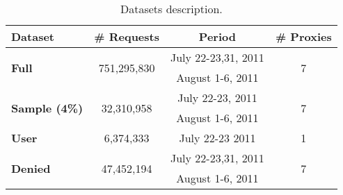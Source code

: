 \documentclass{sig-alternate-2013}
\begin{document}
\begin{table}[t]
\centering
\small
\begin{tabular}{|l|c|c|c|}
	\hline
	 {\bf Dataset} & {\bf \# Requests} & {\bf Period}  & {\bf \# Proxies} \\ 
	\hline 	
	\multirow{2}{*}{\bf Full} & \multirow{2}{*}{751,295,830} &  July 22-23,31, 2011 & \multirow{2}{*}{7} \\
	& & August 1-6, 2011 &  \\ 
\hline
	\multirow{2}{*}{\bf Sample (4\%)} & \multirow{2}{*}{32,310,958} &  July 22-23, 2011 & \multirow{2}{*}{7} \\
	& & August 1-6, 2011 &  \\ 
\hline
	{\bf User} & 6,374,333	 & July 22-23 2011 & 1  \\ 
\hline
	\multirow{2}{*}{\bf Denied} & \multirow{2}{*}{47,452,194} & July 22-23,31, 2011 & \multirow{2}{*}{7} \\
	& & August 1-6, 2011  &  \\ 
\hline
\end{tabular} 
\caption{Datasets description.}\label{tab:dataStat1}
\end{table}
\end{document}
